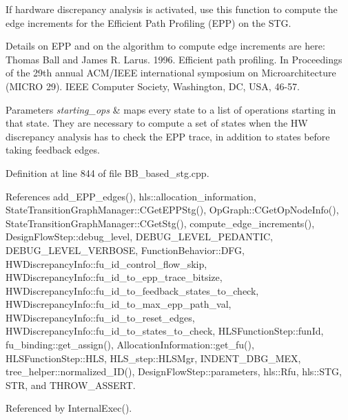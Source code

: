 If hardware discrepancy analysis is activated, use this function to compute the edge increments for the Efficient Path Profiling (E\+PP) on the S\+TG. 

Details on E\+PP and on the algorithm to compute edge increments are here\+: Thomas Ball and James R. Larus. 1996. Efficient path profiling. In Proceedings of the 29th annual A\+C\+M/\+I\+E\+EE international symposium on Microarchitecture (M\+I\+C\+RO 29). I\+E\+EE Computer Society, Washington, DC, U\+SA, 46-\/57.


\begin{DoxyParams}{Parameters}
{\em starting\+\_\+ops} & maps every state to a list of operations starting in that state. They are necessary to compute a set of states when the HW discrepancy analysis has to check the E\+PP trace, in addition to states before taking feedback edges. \\
\hline
\end{DoxyParams}


Definition at line 844 of file B\+B\+\_\+based\+\_\+stg.\+cpp.



References add\+\_\+\+E\+P\+P\+\_\+edges(), hls\+::allocation\+\_\+information, State\+Transition\+Graph\+Manager\+::\+C\+Get\+E\+P\+P\+Stg(), Op\+Graph\+::\+C\+Get\+Op\+Node\+Info(), State\+Transition\+Graph\+Manager\+::\+C\+Get\+Stg(), compute\+\_\+edge\+\_\+increments(), Design\+Flow\+Step\+::debug\+\_\+level, D\+E\+B\+U\+G\+\_\+\+L\+E\+V\+E\+L\+\_\+\+P\+E\+D\+A\+N\+T\+IC, D\+E\+B\+U\+G\+\_\+\+L\+E\+V\+E\+L\+\_\+\+V\+E\+R\+B\+O\+SE, Function\+Behavior\+::\+D\+FG, H\+W\+Discrepancy\+Info\+::fu\+\_\+id\+\_\+control\+\_\+flow\+\_\+skip, H\+W\+Discrepancy\+Info\+::fu\+\_\+id\+\_\+to\+\_\+epp\+\_\+trace\+\_\+bitsize, H\+W\+Discrepancy\+Info\+::fu\+\_\+id\+\_\+to\+\_\+feedback\+\_\+states\+\_\+to\+\_\+check, H\+W\+Discrepancy\+Info\+::fu\+\_\+id\+\_\+to\+\_\+max\+\_\+epp\+\_\+path\+\_\+val, H\+W\+Discrepancy\+Info\+::fu\+\_\+id\+\_\+to\+\_\+reset\+\_\+edges, H\+W\+Discrepancy\+Info\+::fu\+\_\+id\+\_\+to\+\_\+states\+\_\+to\+\_\+check, H\+L\+S\+Function\+Step\+::fun\+Id, fu\+\_\+binding\+::get\+\_\+assign(), Allocation\+Information\+::get\+\_\+fu(), H\+L\+S\+Function\+Step\+::\+H\+LS, H\+L\+S\+\_\+step\+::\+H\+L\+S\+Mgr, I\+N\+D\+E\+N\+T\+\_\+\+D\+B\+G\+\_\+\+M\+EX, tree\+\_\+helper\+::normalized\+\_\+\+I\+D(), Design\+Flow\+Step\+::parameters, hls\+::\+Rfu, hls\+::\+S\+TG, S\+TR, and T\+H\+R\+O\+W\+\_\+\+A\+S\+S\+E\+RT.



Referenced by Internal\+Exec().

